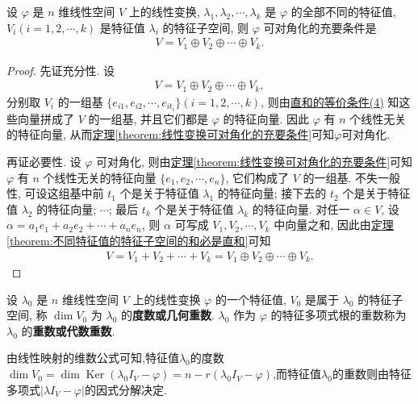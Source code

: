 \documentclass[../../main.tex]{subfiles}
\begin{document}
\begin{theorem}[线性变换可对角化的充要条件]\label{theorem:线性变换可对角化的充要条件2}
设 $\varphi$ 是 $n$ 维线性空间 $V$ 上的线性变换, $\lambda_1, \lambda_2, \cdots, \lambda_k$ 是 $\varphi$ 的全部不同的特征值, $V_i (i = 1, 2, \cdots, k)$ 是特征值 $\lambda_i$ 的特征子空间, 则 $\varphi$ 可对角化的充要条件是
\begin{align*}
V = V_1 \oplus V_2 \oplus \cdots \oplus V_k.
\end{align*}
\end{theorem}
\begin{proof}
先证充分性. 设
\begin{align*}
V = V_1 \oplus V_2 \oplus \cdots \oplus V_k,
\end{align*}
分别取 $V_i$ 的一组基 $\{e_{i1}, e_{i2}, \cdots, e_{it_i}\} (i = 1, 2, \cdots, k)$, 则由\hyperref[theorem:直和的等价条件]{直和的等价条件(4)} 知这些向量拼成了 $V$ 的一组基, 并且它们都是 $\varphi$ 的特征向量. 因此 $\varphi$ 有 $n$ 个线性无关的特征向量, 从而\hyperref[theorem:线性变换可对角化的充要条件]{定理\ref{theorem:线性变换可对角化的充要条件}}可知$\varphi$可对角化.

再证必要性. 设 $\varphi$ 可对角化, 则由\hyperref[theorem:线性变换可对角化的充要条件]{定理\ref{theorem:线性变换可对角化的充要条件}}可知$\varphi$ 有 $n$ 个线性无关的特征向量 $\{e_1, e_2, \cdots, e_n\}$, 它们构成了 $V$ 的一组基. 不失一般性, 可设这组基中前 $t_1$ 个是关于特征值 $\lambda_1$ 的特征向量; 接下去的 $t_2$ 个是关于特征值 $\lambda_2$ 的特征向量; $\cdots$; 最后 $t_k$ 个是关于特征值 $\lambda_k$ 的特征向量. 对任一 $\alpha \in V$, 设 $\alpha = a_1 e_1 + a_2 e_2 + \cdots + a_n e_n$, 则 $\alpha$ 可写成 $V_1, V_2, \cdots, V_k$ 中向量之和, 因此由\hyperref[theorem:不同特征值的特征子空间的和必是直和]{定理\ref{theorem:不同特征值的特征子空间的和必是直和}}可知
\begin{align*}
V = V_1 + V_2 + \cdots + V_k = V_1 \oplus V_2 \oplus \cdots \oplus V_k.
\end{align*}
\end{proof}


\begin{definition}[线性变换的几何重数与代数重数]
设 $\lambda_0$ 是 $n$ 维线性空间 $V$ 上的线性变换 $\varphi$ 的一个特征值, $V_0$ 是属于 $\lambda_0$ 的特征子空间, 称 $\dim V_0$ 为 $\lambda_0$ 的\textbf{度数或几何重数}. $\lambda_0$ 作为 $\varphi$ 的特征多项式根的重数称为 $\lambda_0$ 的\textbf{重数或代数重数}.
\end{definition}
\begin{note}
由线性映射的维数公式可知,特征值$\lambda_0$的度数$\dim V_0 = \dim \operatorname{Ker}(\lambda_0 I_V - \varphi) = n - r(\lambda_0 I_V - \varphi)$,而特征值$\lambda_0$的重数则由特征多项式$|\lambda I_V - \varphi|$的因式分解决定.
\end{note}
\end{document}
